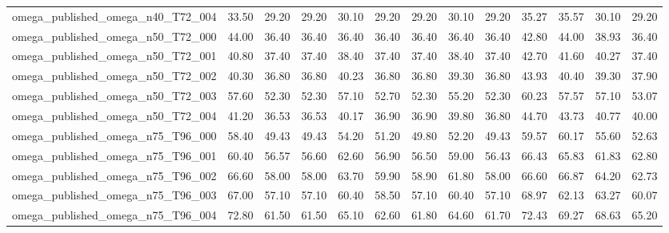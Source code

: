 \begin{table}[htbp]
\begin{tabular}{lrrrrrrrrrrrr}
omega\_published\_omega\_n40\_T72\_004 & 33.50 & 29.20 & 29.20 & 30.10 & 29.20 & 29.20 & 30.10 & 29.20 & 35.27 & 35.57 & 30.10 & 29.20 \\
omega\_published\_omega\_n50\_T72\_000 & 44.00 & 36.40 & 36.40 & 36.40 & 36.40 & 36.40 & 36.40 & 36.40 & 42.80 & 44.00 & 38.93 & 36.40 \\
omega\_published\_omega\_n50\_T72\_001 & 40.80 & 37.40 & 37.40 & 38.40 & 37.40 & 37.40 & 38.40 & 37.40 & 42.70 & 41.60 & 40.27 & 37.40 \\
omega\_published\_omega\_n50\_T72\_002 & 40.30 & 36.80 & 36.80 & 40.23 & 36.80 & 36.80 & 39.30 & 36.80 & 43.93 & 40.40 & 39.30 & 37.90 \\
omega\_published\_omega\_n50\_T72\_003 & 57.60 & 52.30 & 52.30 & 57.10 & 52.70 & 52.30 & 55.20 & 52.30 & 60.23 & 57.57 & 57.10 & 53.07 \\
omega\_published\_omega\_n50\_T72\_004 & 41.20 & 36.53 & 36.53 & 40.17 & 36.90 & 36.90 & 39.80 & 36.80 & 44.70 & 43.73 & 40.77 & 40.00 \\
omega\_published\_omega\_n75\_T96\_000 & 58.40 & 49.43 & 49.43 & 54.20 & 51.20 & 49.80 & 52.20 & 49.43 & 59.57 & 60.17 & 55.60 & 52.63 \\
omega\_published\_omega\_n75\_T96\_001 & 60.40 & 56.57 & 56.60 & 62.60 & 56.90 & 56.50 & 59.00 & 56.43 & 66.43 & 65.83 & 61.83 & 62.80 \\
omega\_published\_omega\_n75\_T96\_002 & 66.60 & 58.00 & 58.00 & 63.70 & 59.90 & 58.90 & 61.80 & 58.00 & 66.60 & 66.87 & 64.20 & 62.73 \\
omega\_published\_omega\_n75\_T96\_003 & 67.00 & 57.10 & 57.10 & 60.40 & 58.50 & 57.10 & 60.40 & 57.10 & 68.97 & 62.13 & 63.27 & 60.07 \\
omega\_published\_omega\_n75\_T96\_004 & 72.80 & 61.50 & 61.50 & 65.10 & 62.60 & 61.80 & 64.60 & 61.70 & 72.43 & 69.27 & 68.63 & 65.20 \\
\bottomrule
\end{tabular}
\end{table}
